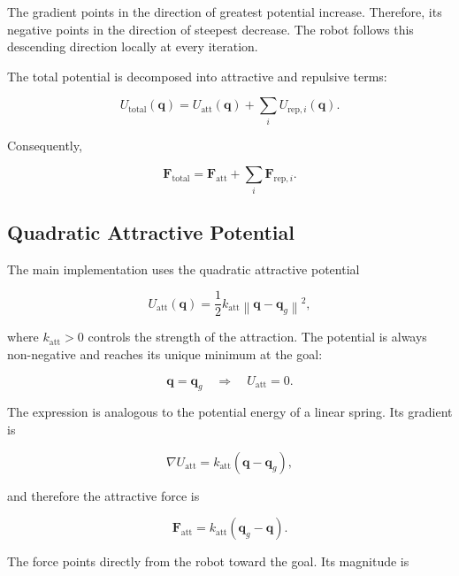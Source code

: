 \documentclass[10pt,twocolumn,a4paper]{article}
\begin{document}
The gradient points in the direction of greatest potential increase.
Therefore, its negative points in the direction of steepest decrease. The
robot follows this descending direction locally at every iteration.

The total potential is decomposed into attractive and repulsive terms:

\begin{equation}
    U_{\mathrm{total}}(\mathbf{q})
    =
    U_{\mathrm{att}}(\mathbf{q})
    +
    \sum_i U_{\mathrm{rep},i}(\mathbf{q}).
    \label{eq:total_potential}
\end{equation}

Consequently,

\begin{equation}
    \mathbf{F}_{\mathrm{total}}
    =
    \mathbf{F}_{\mathrm{att}}
    +
    \sum_i \mathbf{F}_{\mathrm{rep},i}.
    \label{eq:total_force}
\end{equation}

\subsection{Quadratic Attractive Potential}

The main implementation uses the quadratic attractive potential

\begin{equation}
    U_{\mathrm{att}}(\mathbf{q})
    =
    \frac{1}{2}k_{\mathrm{att}}
    \left\|\mathbf{q}-\mathbf{q}_g\right\|^2,
    \label{eq:quadratic_potential}
\end{equation}

where $k_{\mathrm{att}}>0$ controls the strength of the attraction. The
potential is always non-negative and reaches its unique minimum at the goal:

\[
    \mathbf{q}=\mathbf{q}_g
    \quad\Rightarrow\quad
    U_{\mathrm{att}}=0.
\]

The expression is analogous to the potential energy of a linear spring. Its
gradient is

\[
    \nabla U_{\mathrm{att}}
    =
    k_{\mathrm{att}}(\mathbf{q}-\mathbf{q}_g),
\]

and therefore the attractive force is

\begin{equation}
    \mathbf{F}_{\mathrm{att}}
    =
    k_{\mathrm{att}}(\mathbf{q}_g-\mathbf{q}).
    \label{eq:quadratic_force}
\end{equation}

The force points directly from the robot toward the goal. Its magnitude is
\end{document}
